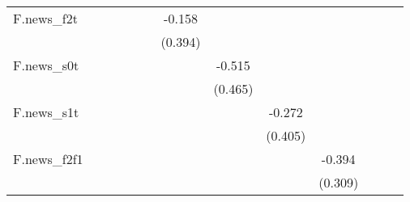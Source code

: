 {\begin{tabular}{l*{12}{c}}
\addlinespace
F.news\_f2t  &                     &                     &                     &                     &                     &      -0.158         &                     &                     &                     &                     &                     &                     \\
            &                     &                     &                     &                     &                     &     (0.394)         &                     &                     &                     &                     &                     &                     \\
\addlinespace
F.news\_s0t  &                     &                     &                     &                     &                     &                     &      -0.515         &                     &                     &                     &                     &                     \\
            &                     &                     &                     &                     &                     &                     &     (0.465)         &                     &                     &                     &                     &                     \\
\addlinespace
F.news\_s1t  &                     &                     &                     &                     &                     &                     &                     &      -0.272         &                     &                     &                     &                     \\
            &                     &                     &                     &                     &                     &                     &                     &     (0.405)         &                     &                     &                     &                     \\
\addlinespace
F.news\_f2f1 &                     &                     &                     &                     &                     &                     &                     &                     &      -0.394         &                     &                     &                     \\
            &                     &                     &                     &                     &                     &                     &                     &                     &     (0.309)         &                     &                     &                     \\

\end{tabular}}
